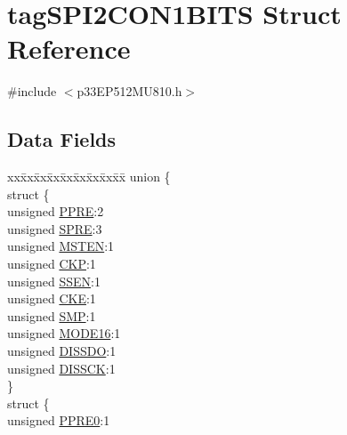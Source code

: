 \hypertarget{structtag_s_p_i2_c_o_n1_b_i_t_s}{}\section{tag\+S\+P\+I2\+C\+O\+N1\+B\+I\+TS Struct Reference}
\label{structtag_s_p_i2_c_o_n1_b_i_t_s}


{\ttfamily \#include $<$p33\+E\+P512\+M\+U810.\+h$>$}

\subsection*{Data Fields}
\begin{DoxyCompactItemize}
\item 
\begin{tabbing}
xx\=xx\=xx\=xx\=xx\=xx\=xx\=xx\=xx\=\kill
union \{\\
\>struct \{\\
\>\>unsigned \hyperlink{structtag_s_p_i2_c_o_n1_b_i_t_s_a328a5a76e4d964cd323b8fc7ec480a65}{PPRE}:2\\
\>\>unsigned \hyperlink{structtag_s_p_i2_c_o_n1_b_i_t_s_ac4fc398d060ce31eebf7055f67519250}{SPRE}:3\\
\>\>unsigned \hyperlink{structtag_s_p_i2_c_o_n1_b_i_t_s_acb4900cdfd8a4b59377c2aa8a4fc82c5}{MSTEN}:1\\
\>\>unsigned \hyperlink{structtag_s_p_i2_c_o_n1_b_i_t_s_afb5f6f71e7650f128b6e5c04036cd48f}{CKP}:1\\
\>\>unsigned \hyperlink{structtag_s_p_i2_c_o_n1_b_i_t_s_ae77e6e9fafcdae4e5b7f261d00459ade}{SSEN}:1\\
\>\>unsigned \hyperlink{structtag_s_p_i2_c_o_n1_b_i_t_s_ad6e30ba11b5574f8a5f548a818b64186}{CKE}:1\\
\>\>unsigned \hyperlink{structtag_s_p_i2_c_o_n1_b_i_t_s_a94751e12e00a82cf122e0d82aa7cfdbf}{SMP}:1\\
\>\>unsigned \hyperlink{structtag_s_p_i2_c_o_n1_b_i_t_s_ae096fb6fc65299accb5c75e3d306e425}{MODE16}:1\\
\>\>unsigned \hyperlink{structtag_s_p_i2_c_o_n1_b_i_t_s_a2cbce11395d8c5eb5f91ba935acaea6b}{DISSDO}:1\\
\>\>unsigned \hyperlink{structtag_s_p_i2_c_o_n1_b_i_t_s_ac9a14e83bad7551e878fdaed7d16bfa3}{DISSCK}:1\\
\>\} \\
\>struct \{\\
\>\>unsigned \hyperlink{structtag_s_p_i2_c_o_n1_b_i_t_s_ae7a242158d2a5a81e609501ba93b1d20}{PPRE0}:1\\

\end{tabbing}
\end{DoxyCompactItemize}

